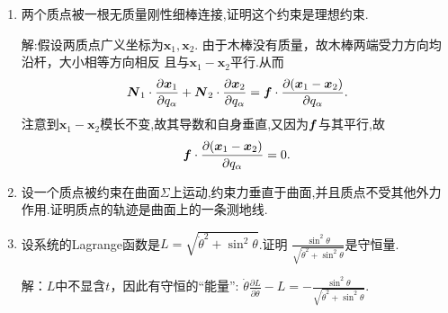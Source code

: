 \begin{enumerate}
    注：由此方程即可得到匀速转动参考系中的惯性离心力和Coriolis力。

    解：以$(x,y)$为地面上的直角坐标，则$x=\xi \cos(\omega t)+ \eta \sin 
    (\omega t)$, $y=-\xi \sin (\omega t)+ \eta \cos (\omega t)$.Lagrange
    函数为\begin{align*}
        L=\frac{1}{2}m(\dot{x}^2+\dot{y}^2)=\frac{1}{2}m(\dot{\xi}^2
        +\dot{\eta}^2+\omega^2\xi^2+\omega^2\eta^2+\omega\dot{\xi}\eta
        -\omega\xi\dot{\eta})
    \end{align*}
    Lagrange方程为\begin{align*}
        \ddot{\xi}=\omega^2\xi-2\omega\dot{\eta}, \quad \ddot{\eta}=\omega^2
        \eta+2\omega\dot{\xi}
    \end{align*}
    \item 两个质点被一根无质量刚性细棒连接,证明这个约束是理想约束.

    解:假设两质点广义坐标为$\boldsymbol{x}_1,\boldsymbol{x}_2$.
    由于木棒没有质量，故木棒两端受力方向均沿杆，大小相等方向相反
    且与$\boldsymbol{x}_1-\boldsymbol{x}_2$平行.从而
    \[\boldsymbol{N}_1\cdot\frac{\partial\boldsymbol{x}_1}{\partial q_\alpha}
    +\boldsymbol{N}_2\cdot\frac{\partial\boldsymbol{x}_2}{\partial q_\alpha}
    =\boldsymbol{f}\cdot\frac{\partial(\boldsymbol{x}_1-\boldsymbol{x}_2)}{\partial q_\alpha}.\]
    注意到$\boldsymbol{x}_1-\boldsymbol{x}_2$模长不变,故其导数和自身垂直,又因为$\boldsymbol{f}$与其平行,故
    \[\boldsymbol{f}\cdot\frac{\partial(\boldsymbol{x}_1-\boldsymbol{x}_2)}{\partial q_\alpha}=0.\]

    \item 设一个质点被约束在曲面$\Sigma$上运动,约束力垂直于曲面,并且质点不受其他外力作用.证明质点的轨迹是曲面上的一条测地线.

    \item 设系统的Lagrange函数是$L=\sqrt{\dot{\theta}^2+\sin^2\theta}$.证明
    $\displaystyle \frac{\sin^2\theta}{\sqrt{\dot{\theta}^2+\sin^2\theta}}$是守恒量.

    解：$L$中不显含$t$，因此有守恒的“能量”: $\dot{\theta}\displaystyle\frac
    {\partial L}{\partial \dot{\theta}}-L=-\displaystyle \frac{\sin^2\theta}
    {\sqrt{\dot{\theta}^2+\sin^2\theta}}$.
\end{enumerate}


